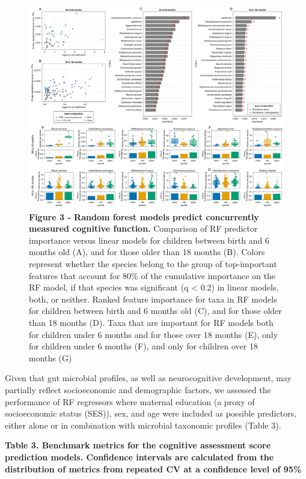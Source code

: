 \documentclass[a4paper]{article}
\begin{document}
\begin{figure}[h]
    \centering
    \includegraphics[width=\textwidt]{assets/Figure3.png}
    \caption{
        \textbf{Figure 3 - Random forest models predict concurrently measured cognitive function.}
        Comparison of RF predictor importance versus linear models for children
        between birth and 6 months old (A), and for those older than 18 months
        (B). Colors represent whether the species belong to the group of
        top-important features that account for 80\% of the cumulative
        importance on the RF model, if that species was significant (q
        \textless{} 0.2) in linear models, both, or neither. Ranked feature
        importance for taxa in RF models for children between birth and 6 months
        old (C), and for those older than 18 months (D). Taxa that are important
        for RF models both for children under 6 months and for those over 18
        months (E), only for children under 6 months (F), and only for children
        over 18 months (G)
    }
    \label{fig:Figure 3}
\end{figure}

Given that gut microbial profiles, as well as neurocognitive
development, may partially reflect socioeconomic and demographic
factors, we assessed the performance of RF regressors where maternal
education (a proxy of socioeconomic status (SES)), sex, and age were
included as possible predictors, either alone or in combination with
microbial taxonomic profiles (Table 3).

\textbf{Table 3. Benchmark metrics for the cognitive assessment score
prediction models. Confidence intervals are calculated from the
distribution of metrics from repeated CV at a confidence level of 95\%}
\end{document}
